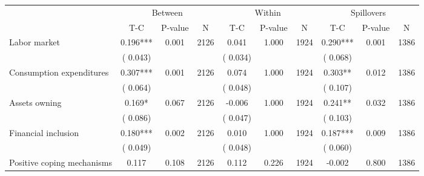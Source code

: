 
\begin{tabular}{l*{9}{c}}\hline&\multicolumn{3}{c}{Between}&\multicolumn{3}{c}{Within}&\multicolumn{3}{c}{Spillovers} \\ \cmidrule(r){2-4}\cmidrule(l){5-7}\cmidrule(l){8-10} & {T-C} & {P-value} & {N} & {T-C} & {P-value} & {N}  & {T-C} & {P-value} & {N}  \\ \midrule
 Labor market                 &              0.196***          &        0.001 & 2126          &              0.041          &        1.000 & 1924          &        0.290*** &        0.001 & 1386                 \\ 
                               &        (       0.043) & &                                                                 &       (       0.034) & &                                                          &       (       0.068)      & &     \\ 
 Consumption expenditures                 &              0.307***          &        0.001 & 2126          &              0.074 &        1.000 & 1924                   &        0.303** &        0.012 & 1386                 \\ 
                               &        (       0.064) & &                                                                 &       (       0.048) & &                                                          &       (       0.107) & &  \\ 
 Assets owning                 &              0.169*          &        0.067 & 2126          &             -0.006 &        1.000 & 1924                   &        0.241** &        0.032 & 1386                 \\ 
                               &        (       0.086) & &                                                                 &       (       0.047) & &                                                          & (       0.103)                                    \\ 
 Financial inclusion                 &              0.180***          &        0.002 & 2126          &              0.010 &        1.000 & 1924                   &        0.187*** &        0.009 & 1386                 \\ 
                               &        (       0.049) & &                                                                 &       (       0.048) & &                                                          &       (       0.060) & &   \\ 
 Positive coping mechanisms                 &              0.117          &        0.108 & 2126          &              0.112 &        0.226 & 1924                   &       -0.002 &        0.800 & 1386                 \\ 

\end{tabular}
